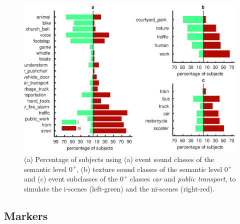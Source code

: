 \documentclass[twoside,twocolumn]{article}
\begin{document}
\begin{figure}[t!]
\begin{center}
\includegraphics[scale=1]{../gfxMatlab/xp1_class_1.eps}
    \caption{\label{fig:xp1_class_1} (a) Percentage of subjects using (a) event sound classes of the semantic level $0^{+}$, (b) texture sound classes of the semantic level $0^{+}$ and (c) event subclasses of the $0^{+}$ classes \emph{car} and \emph{public transport}, to simulate the i-scenes (left-green) and the ni-scenes (right-red).}
\end{center}
\end{figure}


\subsection{Markers}
\label{sec:markers}
\end{document}
